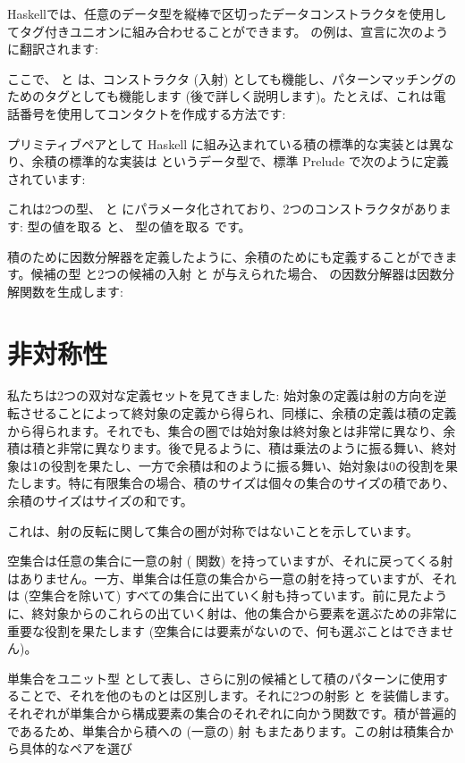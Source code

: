 Haskellでは、任意のデータ型を縦棒で区切ったデータコンストラクタを使用してタグ付きユニオンに組み合わせることができます。 の例は、宣言に次のように翻訳されます:

ここで、 と  は、コンストラクタ (入射) としても機能し、パターンマッチングのためのタグとしても機能します (後で詳しく説明します)。たとえば、これは電話番号を使用してコンタクトを作成する方法です:

プリミティブペアとして Haskell に組み込まれている積の標準的な実装とは異なり、余積の標準的な実装は  というデータ型で、標準 Prelude で次のように定義されています:

これは2つの型、 と  にパラメータ化されており、2つのコンストラクタがあります:  型の値を取る  と、 型の値を取る  です。

積のために因数分解器を定義したように、余積のためにも定義することができます。候補の型  と2つの候補の入射  と  が与えられた場合、 の因数分解器は因数分解関数を生成します:


\section{非対称性}

私たちは2つの双対な定義セットを見てきました: 始対象の定義は射の方向を逆転させることによって終対象の定義から得られ、同様に、余積の定義は積の定義から得られます。それでも、集合の圏では始対象は終対象とは非常に異なり、余積は積と非常に異なります。後で見るように、積は乗法のように振る舞い、終対象は1の役割を果たし、一方で余積は和のように振る舞い、始対象は0の役割を果たします。特に有限集合の場合、積のサイズは個々の集合のサイズの積であり、余積のサイズはサイズの和です。

これは、射の反転に関して集合の圏が対称ではないことを示しています。

空集合は任意の集合に一意の射 ( 関数) を持っていますが、それに戻ってくる射はありません。一方、単集合は任意の集合から一意の射を持っていますが、それは (空集合を除いて) すべての集合に出ていく射も持っています。前に見たように、終対象からのこれらの出ていく射は、他の集合から要素を選ぶための非常に重要な役割を果たします (空集合には要素がないので、何も選ぶことはできません)。

単集合をユニット型 \code{()} として表し、さらに別の候補として積のパターンに使用することで、それを他のものとは区別します。それに2つの射影  と  を装備します。それぞれが単集合から構成要素の集合のそれぞれに向かう関数です。積が普遍的であるため、単集合から積への (一意の) 射  もまたあります。この射は積集合から具体的なペアを選び

